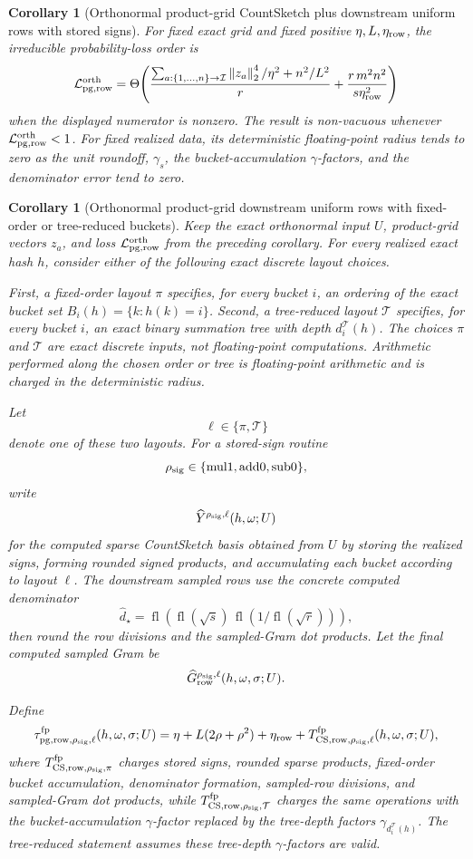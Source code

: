 \documentclass[11pt]{article}
\newcommand{\Norm}[1]{\left\lVert #1\right\rVert_2}
\newcommand{\fl}{\operatorname{fl}}
\newtheorem{corollary}[theorem]{Corollary}
\theoremstyle{remark}
\begin{document}
\begin{corollary}[Orthonormal product-grid CountSketch plus downstream uniform rows with stored signs]
For fixed exact grid and fixed positive \(\eta,L,\eta_{\rm row}\), the
irreducible probability-loss order is
\[
  \mathcal L_{\rm pg,row}^{\rm orth}
  =
  \Theta\!\left(
    \frac{
      \sum_{a:\{1,\ldots,n\}\to\mathcal I}\Norm{z_a}^4/\eta^2
      +
      n^2/L^2
    }{r}
    +
    \frac{r\,m^2n^2}{s\eta_{\rm row}^2}
  \right)
\]
when the displayed numerator is nonzero.  The result is non-vacuous whenever
\(\mathcal L_{\rm pg,row}^{\rm orth}<1\).  For fixed realized data, its
deterministic floating-point radius tends to zero as the unit roundoff,
\(\gamma_s\), the bucket-accumulation \(\gamma\)-factors, and the denominator
error tend to zero.
\end{corollary}

\begin{corollary}[Orthonormal product-grid downstream uniform rows with fixed-order or tree-reduced buckets]
Keep the exact orthonormal input \(U\), product-grid vectors \(z_a\), and
loss \(\mathcal L_{\rm pg,row}^{\rm orth}\) from the preceding corollary.
For every realized exact hash \(h\), consider either of the following exact
discrete layout choices.

First, a fixed-order layout \(\pi\) specifies, for every bucket \(i\), an
ordering of the exact bucket set \(B_i(h)=\{k:h(k)=i\}\).  Second, a
tree-reduced layout \(\mathcal T\) specifies, for every bucket \(i\), an exact
binary summation tree with depth \(d_i^{\mathcal T}(h)\).  The choices
\(\pi\) and \(\mathcal T\) are exact discrete inputs, not floating-point
computations.  Arithmetic performed along the chosen order or tree is
floating-point arithmetic and is charged in the deterministic radius.

Let
\[
  \ell\in\{\pi,\mathcal T\}
\]
denote one of these two layouts.  For a stored-sign routine
\[
  \rho_{\rm sig}\in\{\mathrm{mul1},\mathrm{add0},\mathrm{sub0}\},
\]
write
\[
  \widehat Y^{\rho_{\rm sig},\ell}(h,\omega;U)
\]
for the computed sparse CountSketch basis obtained from \(U\) by storing the
realized signs, forming rounded signed products, and accumulating each bucket
according to layout \(\ell\).  The downstream sampled rows use the concrete
computed denominator
\[
  \widehat d_\star
  =
  \fl\!\left(
    \fl(\sqrt{s})\,\fl(1/\fl(\sqrt r))
  \right),
\]
then round the row divisions and the sampled-Gram dot products.  Let the final
computed sampled Gram be
\[
  \widehat G_{{\rm row}}^{\rho_{\rm sig},\ell}(h,\omega,\sigma;U).
\]

Define
\[
  \tau_{{\rm pg,row},\rho_{\rm sig},\ell}^{\rm fp}
  (h,\omega,\sigma;U)
  =
  \eta+L(2\rho+\rho^2)
  +\eta_{\rm row}
  +T_{{\rm CS,row},\rho_{\rm sig},\ell}^{\rm fp}(h,\omega,\sigma;U),
\]
where \(T_{{\rm CS,row},\rho_{\rm sig},\pi}^{\rm fp}\) charges stored signs,
rounded sparse products, fixed-order bucket accumulation, denominator
formation, sampled-row divisions, and sampled-Gram dot products, while
\(T_{{\rm CS,row},\rho_{\rm sig},\mathcal T}^{\rm fp}\) charges the same
operations with the bucket-accumulation \(\gamma\)-factor replaced by the
tree-depth factors \(\gamma_{d_i^{\mathcal T}(h)}\).  The tree-reduced
statement assumes these tree-depth \(\gamma\)-factors are valid.


\end{corollary}
\end{document}

